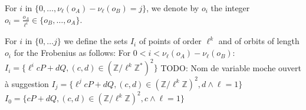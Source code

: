 \documentclass{lms}
\newcommand{\todo}[1]{{\color{red}TODO: #1}}
\begin{document}
\begin{defi}
  For $i$ in $\{0, \dots,\nu_{\ell}(o_A)-\nu_{\ell}(o_B)=j\}$, we denote by $o_i$
  the integer $o_i =\frac{o_A}{\ell^i} \in \{o_B,\dots,o_A\}$.
\end{defi}




\begin{defi}
For $i$ in $\{0,\dots j\}$ we define the sets
$I_i$ of points of order $\ell^k$ and of orbits of length $o_i$ for the Frobenius as follows:
\newline
For $0 < i < \nu_{\ell}(o_A)-\nu_{\ell}(o_B)$:
$I_i=\{ \ell^i c P + d Q, (c,d) \in \left( \mathbb{Z}/ \ell^k \mathbb{Z}^{*} \right)^2 \} $ \todo{Nom de variable moche ouvert à suggestion}
\newline
$I_j=\{ \ell^j c P + d Q, (c,d) \in \left( \mathbb{Z}/ \ell^k \mathbb{Z} \right)^2, d \wedge \ell =1 \} $
\newline
$I_0=\{ c P + d Q, (c,d) \in \left( \mathbb{Z}/ \ell^k \mathbb{Z} \right)^2, c \wedge \ell =1 \}$
\end{defi}
\end{document}
